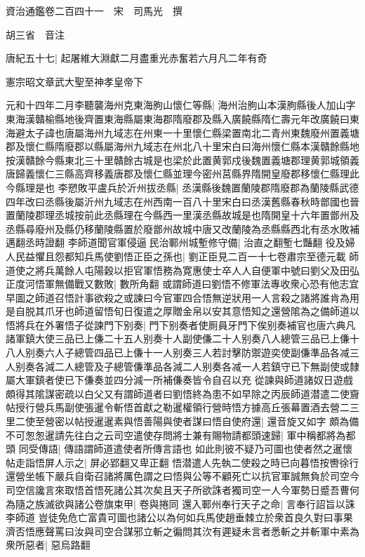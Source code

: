 資治通鑑卷二百四十一　宋　司馬光　撰

胡三省　音注

唐紀五十七|{
	起屠維大淵獻二月盡重光赤奮若六月凡二年有奇}


憲宗昭文章武大聖至神孝皇帝下

元和十四年二月李聽襲海州克東海朐山懷仁等縣|{
	海州治朐山本漢胊縣後人加山字東海漢贛榆縣地後齊置東海縣屬東海郡隋廢郡及縣入廣饒縣隋仁壽元年改廣饒曰東海避太子諱也唐屬海州九域志在州東一十里懷仁縣梁置南北二青州東魏廢州置義塘郡及懷仁縣隋廢郡以縣屬海州九域志在州北八十里宋白曰海州懷仁縣本漢贛餘縣地按漢贛餘今縣東北三十里贛餘古城是也梁於此置黄郭戍後魏置義塘郡理黄郭城領義唐歸義懷仁三縣高齊移義唐郡及懷仁縣並理今密州莒縣界隋開皇廢郡移懷仁縣理此今縣理是也}
李愬敗平盧兵於沂州拔丞縣|{
	丞漢縣後魏置蘭陵郡隋廢郡為蘭陵縣武德四年改曰丞縣後屬沂州九域志在州西南一百八十里宋白曰丞漢舊縣春秋時鄫國也晉置蘭陵郡理丞城按前此丞縣理在今縣西一里漢丞縣故城是也隋開皇十六年置鄫州及丞縣尋廢州及縣仍移蘭陵縣置於廢鄫州故城中唐又改蘭陵為丞縣縣西北有丞水敗補邁翻丞時證翻}
李師道聞官軍侵逼民治鄆州城塹修守備|{
	治直之翻塹七豔翻}
役及婦人民益懼且怨都知兵馬使劉悟正臣之孫也|{
	劉正臣見二百一十七卷肅宗至德元載}
師道使之將兵萬餘人屯陽穀以拒官軍悟務為寛惠使士卒人人自便軍中號曰劉父及田弘正度河悟軍無備戰又數敗|{
	數所角翻}
或謂師道曰劉悟不修軍法專收衆心恐有他志宜早圖之師道召悟計事欲殺之或諫曰今官軍四合悟無逆狀用一人言殺之諸將誰肯為用是自脱其爪牙也師道留悟旬日復遣之厚贈金帛以安其意悟知之還營隂為之備師道以悟將兵在外署悟子從諫門下别奏|{
	門下别奏者使厠員牙門下俟别奏補官也唐六典凡諸軍鎮大使三品已上傔二十五人别奏十人副使傔二十人别奏八人總管三品已上傔十八人别奏六人子總管四品已上傔十一人别奏三人若討擊防禦遊奕使副傔準品各减三人别奏各減二人總管及子總管傔準品各減二人别奏各减一人若鎮守已下無副使或隸屬大軍鎮者使已下傔奏並四分減一所補傔奏皆令自召以充}
從諫與師道諸奴日遊戲頗得其隂謀密疏以白父又有謂師道者曰劉悟終為患不如早除之丙辰師道潜遣二使齎帖授行營兵馬副使張暹令斬悟首獻之勒暹權領行營時悟方據高丘張幕置酒去營二三里二使至營密以帖授暹暹素與悟善陽與使者謀曰悟自使府還|{
	還音旋又如字}
頗為備不可怱怱暹請先往白之云司空遣使存問將士兼有賜物請都頭速歸|{
	軍中稱都將為都頭}
同受傳語|{
	傳語謂師道遣使者所傳言語也}
如此則彼不疑乃可圖也使者然之暹懷帖走詣悟屏人示之|{
	屏必郢翻又卑正翻}
悟潜遣人先執二使殺之時已向暮悟按轡徐行還營坐帳下嚴兵自衛召諸將厲色謂之曰悟與公等不顧死亡以抗官軍誠無負於司空今司空信讒言來取悟首悟死諸公其次矣且天子所欲誅者獨司空一人今軍勢日蹙吾曹何為隨之族滅欲與諸公卷旗束甲|{
	卷與捲同}
還入鄆州奉行天子之命|{
	言奉行詔旨以誅李師道}
豈徒免危亡富貴可圖也諸公以為何如兵馬使趙垂棘立於衆首良久對曰事果濟否悟應聲罵曰汝與司空合謀邪立斬之徧問其㳄有遲疑未言者悉斬之并斬軍中素為衆所惡者|{
	惡烏路翻}
